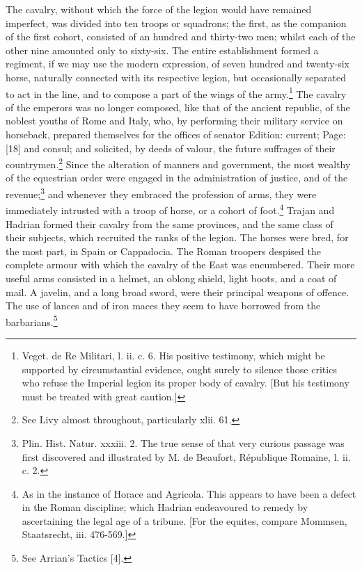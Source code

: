 The cavalry, without which the force of the legion would have remained imperfect, was divided into ten troops or squadrons; the first, as the companion of the first cohort, consisted of an hundred and thirty-two men; whilst each of the other nine amounted only to sixty-six. The entire establishment formed a regiment, if we may use the modern expression, of seven hundred and twenty-six horse, naturally connected with its respective legion, but occasionally separated to act in the line, and to compose a part of the wings of the army.\footnote{Veget. de Re Militari, l. ii. c. 6. His positive testimony, which might be supported by circumstantial evidence, ought surely to silence those critics who refuse the Imperial legion its proper body of cavalry. [But his testimony must be treated with great caution.]} The cavalry of the emperors was no longer composed, like that of the ancient republic, of the noblest youths of Rome and Italy, who, by performing their military service on horseback, prepared themselves for the offices of senator Edition: current; Page: [18] and consul; and solicited, by deeds of valour, the future suffrages of their countrymen.\footnote{See Livy almost throughout, particularly xlii. 61.} Since the alteration of manners and government, the most wealthy of the equestrian order were engaged in the administration of justice, and of the revenue;\footnote{Plin. Hist. Natur. xxxiii. 2. The true sense of that very curious passage was first discovered and illustrated by M. de Beaufort, République Romaine, l. ii. c. 2.} and whenever they embraced the profession of arms, they were immediately intrusted with a troop of horse, or a cohort of foot.\footnote{As in the instance of Horace and Agricola. This appears to have been a defect in the Roman discipline; which Hadrian endeavoured to remedy by ascertaining the legal age of a tribune. [For the equites, compare Mommsen, Staatsrecht, iii. 476-569.]} Trajan and Hadrian formed their cavalry from the same provinces, and the same class of their subjects, which recruited the ranks of the legion. The horses were bred, for the most part, in Spain or Cappadocia. The Roman troopers despised the complete armour with which the cavalry of the East was encumbered. Their more useful arms consisted in a helmet, an oblong shield, light boots, and a coat of mail. A javelin, and a long broad sword, were their principal weapons of offence. The use of lances and of iron maces they seem to have borrowed from the barbarians.\footnote{See Arrian\texthebrew{}’s Tactics [4].}

